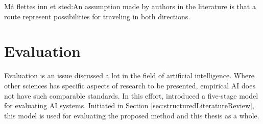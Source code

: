 Må flettes inn et sted:An assumption made by authors in the literature is that a route represent possibilities for traveling in both directions.

\section{Evaluation}


Evaluation is an issue discussed a lot in the field of artificial intelligence. Where other sciences has specific aspects of research to be presented, empirical AI does not have such comparable standards. In this effort, \citet{cohen88} introduced a five-stage model for evaluating AI systems. Initiated in Section \vref{sec:structuredLiteratureReview}, this model is used for evaluating the proposed method and this thesis as a whole. %




